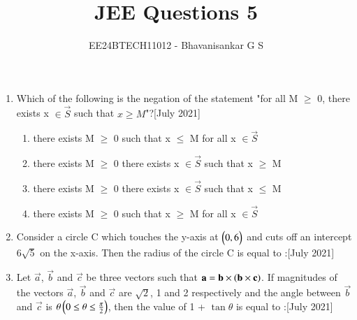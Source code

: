 \documentclass[journal,12pt,onecolumn]{IEEEtran}
\theoremstyle{remark}
\begin{document}

\vspace{3cm}

\title{JEE Questions 5}
\author{EE24BTECH11012 - Bhavanisankar G S}
\maketitle
\newpage
\bigskip

\renewcommand{\thefigure}{\theenumi}
\renewcommand{\thetable}{\theenumi}
\begin{enumerate}
	\item Which of the following is the negation of the statement "for all M $\geq$ 0, there exists x $\in \vec{S}$ such that $x\geq M$"?\hfill{[July 2021]}
		\begin{enumerate}
			\item there exists M $\geq$ 0 such that x $\leq$ M for all x $\in \vec{S}$
			\item there exists M $\geq$ 0 there exists x $\in \vec{S}$ such that x $\geq$ M
			\item there exists M $\geq$ 0 there exists x $\in \vec{S}$ such that x $\leq$ M
			\item there exists M $\geq$ 0 such that x $\geq$ M for all x $\in \vec{S}$
		\end{enumerate}
	\item Consider a circle C which touches the y-axis at $\begin{pmatrix}0,6\end{pmatrix}$ and cuts off an intercept $6\sqrt{5}$ on the x-axis. Then the radius of the circle C is equal to :\hfill{[July 2021]}
		\begin{enumerate}
		\end{enumerate}
	\item Let $\vec{a}$, $\vec{b}$ and $\vec{c}$ be three vectors such that $\mathbf{a} = \mathbf{b} \times \left(\mathbf{b} \times \mathbf{c}\right)$. If magnitudes of the vectors $\vec{a}$, $\vec{b}$ and $\vec{c}$ are $\sqrt{2}$, 1 and 2 respectively and the angle between $\vec{b}$ and $\vec{c}$ is $\theta \left(0 \leq \theta \leq \frac{\pi}{2}\right)$, then the value of 1 + $\tan{\theta}$ is equal to :\hfill{[July 2021]}
		\begin{enumerate}
				\begin{multicols}{4}

\end{multicols}
\end{enumerate}
\end{enumerate}
\end{document}
